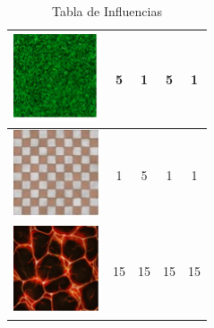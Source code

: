 \begin{table}[H]
\begin{tabular}{|c|c|c|c|c|}
        \hline
        \includegraphics{imagesTable/hierba} & 5 & 1 & 5 & 1 \\
        \hline
        \includegraphics[scale=0.5]{imagesTable/suelo} & 1 & 5 & 1 & 1 \\
        \hline
        \includegraphics{imagesTable/lava} & 15 & 15 & 15 & 15 \\
        \hline
    \end{tabular}
    \caption{Tabla de Influencias}
\end{table}
